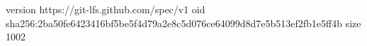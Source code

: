version https://git-lfs.github.com/spec/v1
oid sha256:2ba50fe6423416bf5be5f4d79a2e8c5d076ce64099d8d7e5b513ef2fb1e5ff4b
size 1002
